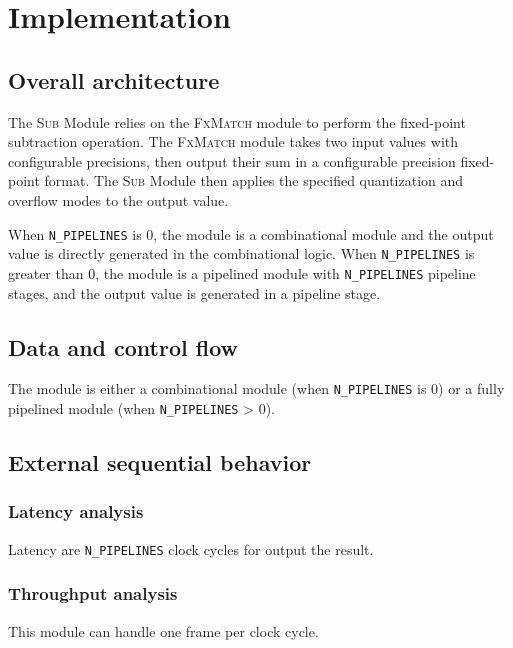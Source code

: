 \documentclass[a4paper, oneside]{report}
\begin{document}
        

    \chapter{Implementation}
        \section{Overall architecture}
                The \textsc{Sub} Module relies on the \textsc{FxMatch} module to perform the fixed-point subtraction operation. The \textsc{FxMatch} module takes two input values with configurable precisions, then output their sum in a configurable precision fixed-point format. The \textsc{Sub} Module then applies the specified quantization and overflow modes to the output value.

                When \texttt{N\_PIPELINES} is 0, the module is a combinational module and the output value is directly generated in the combinational logic. When \texttt{N\_PIPELINES} is greater than 0, the module is a pipelined module with \texttt{N\_PIPELINES} pipeline stages, and the output value is generated in a pipeline stage.
                
        \section{Data and control flow}
            The module is either a combinational module (when \texttt{N\_PIPELINES} is 0) or a fully pipelined module (when \texttt{N\_PIPELINES} > 0). 
            \section{External sequential behavior}
            \subsection{Latency analysis}
                Latency are \texttt{N\_PIPELINES} clock cycles for output the result.
            \subsection{Throughput analysis}
                This module can handle one frame per clock cycle.


\end{document}
